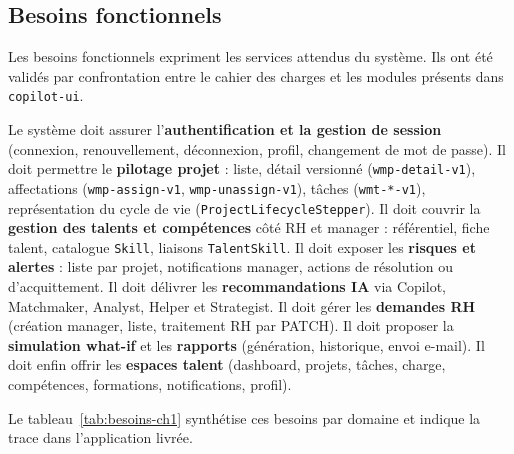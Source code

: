 \subsection{Besoins fonctionnels}

Les besoins fonctionnels expriment les services attendus du système. Ils ont été validés par confrontation entre le cahier des charges et les modules présents dans \texttt{copilot-ui}.

Le système doit assurer l'\textbf{authentification et la gestion de session} (connexion, renouvellement, déconnexion, profil, changement de mot de passe). Il doit permettre le \textbf{pilotage projet} : liste, détail versionné (\texttt{wmp-detail-v1}), affectations (\texttt{wmp-assign-v1}, \texttt{wmp-unassign-v1}), tâches (\texttt{wmt-*-v1}), représentation du cycle de vie (\texttt{ProjectLifecycleStepper}). Il doit couvrir la \textbf{gestion des talents et compétences} côté RH et manager : référentiel, fiche talent, catalogue \texttt{Skill}, liaisons \texttt{TalentSkill}. Il doit exposer les \textbf{risques et alertes} : liste par projet, notifications manager, actions de résolution ou d'acquittement. Il doit délivrer les \textbf{recommandations IA} via Copilot, Matchmaker, Analyst, Helper et Strategist. Il doit gérer les \textbf{demandes RH} (création manager, liste, traitement RH par PATCH). Il doit proposer la \textbf{simulation what-if} et les \textbf{rapports} (génération, historique, envoi e-mail). Il doit enfin offrir les \textbf{espaces talent} (dashboard, projets, tâches, charge, compétences, formations, notifications, profil).

Le tableau~\ref{tab:besoins-ch1} synthétise ces besoins par domaine et indique la trace dans l'application livrée.

